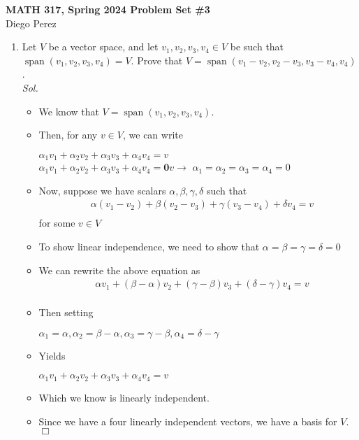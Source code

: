 \documentclass[11pt]{article}
\begin{document}
\begin{center}
\noindent \Large{\textbf{MATH 317, Spring 2024 \hfill Problem Set \#3}}\\
Diego Perez
\end{center}

\begin{enumerate}
	\item Let $V$ be a vector space, and let $v_1,v_2,v_3,v_4 \in V$ be such that $\operatorname{span}(v_1,v_2,v_3,v_4) = V$. Prove that $V = \operatorname{span}(v_1-v_2,v_2-v_3,v_3-v_4,v_4)$.
    \\ \textit{ Sol. }
    \begin{itemize}
      \item[] We know that $V = \operatorname{span}(v_1,v_2,v_3,v_4)$. 
      \item[] Then, for any $v \in V$, we can write \begin{center}
           $\alpha_1 v_1 + \alpha_2 v_2 + \alpha_3 v_3 + \alpha_4 v_4= v $\\
           $\alpha_1 v_1 + \alpha_2 v_2 + \alpha_3 v_3 + \alpha_4 v_4 = {\mathbf 0v} \rightarrow$
          $\alpha_1 = \alpha_2 = \alpha_3 = \alpha_4 = 0$
        \end{center}
      \item[] Now, suppose we have scalars  $\alpha, \beta, \gamma, \delta$ 
        such that \begin{align*}
          & \alpha(v_1 - v_2) + \beta(v_2 - v_3) + \gamma(v_3 - v_4) + \delta v_4 = v \\
        \end{align*}
        for some $v \in V$
      \item[] To show linear independence, we need to show that $\alpha = \beta
        = \gamma = \delta = 0$
      \item[] We can rewrite the above equation as \begin{align*}
          & \alpha v_1 + (\beta - \alpha) v_2 + (\gamma - \beta) v_3 + (\delta - \gamma) v_4 = v \\
        \end{align*}
      \item[] Then setting \begin{center}
          $\alpha_1 = \alpha, \alpha_2 = \beta - \alpha, \alpha_3 = \gamma - \beta, \alpha_4 = \delta - \gamma$
        \end{center}
      \item[] Yields \begin{center}
          $\alpha_1 v_1 + \alpha_2 v_2 + \alpha_3 v_3 + \alpha_4 v_4 = v$
        \end{center}
      \item[] Which we know is linearly independent. 
      \item[] Since we have a four linearly independent vectors, 
        we have a basis for $V$. $\Box$
    \end{itemize}


\end{enumerate}
\end{document}
